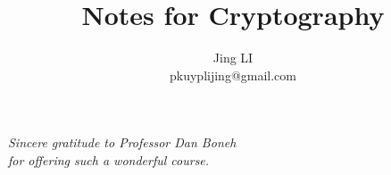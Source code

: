 
\def\PREAMBLE{PREAMBLE}
\title{Notes for Cryptography}
\author{Jing LI\\pkuyplijing@gmail.com}


\pagestyle{empty}
\hypersetup{pageanchor=false}
\maketitle
\begin{center}
\emph{Sincere gratitude to Professor Dan Boneh\\for offering such a wonderful course.}
\end{center}
\tableofcontents
\newpage
\hypersetup{pageanchor=true}
\pagestyle{headings}


